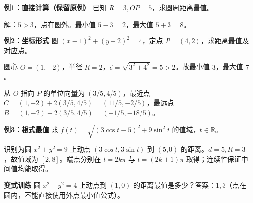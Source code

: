 \begin{examplebox}
\textbf{例1：直接计算（保留原例）}
已知 $R=3,OP=5$，求圆周距离最值。\begin{center}

\end{center}
解：$5>3$，点在圆外。最小值 $5-3=2$，最大值 $5+3=8$。

\textbf{例2：坐标形式} 圆 $(x-1)^2+(y+2)^2=4$，定点 $P=(4,2)$，求距离最值及对应点。

圆心 $O=(1,-2)$，半径 $R=2$，$d=\sqrt{3^2+4^2}=5>2$。故最小值 $3$，最大值 $7$。

从 $O$ 指向 $P$ 的单位向量为 $(3/5,4/5)$，最近点 $C=(1,-2)+2(3/5,4/5)=(11/5,-2/5)$，最远点 $B=(1,-2)-2(3/5,4/5)=(-1/5,-18/5)$。\begin{center}

\end{center}

\textbf{例3：根式最值} 求 $f(t)=\sqrt{(3\cos t-5)^2+9\sin^2t}$ 的值域，$t\in\mathbb R$。

识别为圆 $x^2+y^2=9$ 上动点 $(3\cos t,3\sin t)$ 到 $(5,0)$ 的距离。$d=5,R=3$，故值域为 $[2,8]$。端点分别在 $t=2k\pi$ 与 $t=(2k+1)\pi$ 取得；连续性保证中间值均能取得。\begin{center}

\end{center}

\textbf{变式训练} 圆 $x^2+y^2=4$ 上动点到 $(1,0)$ 的距离最值是多少？答案：$1,3$（点在圆内，不能直接使用外点最小值公式）。
\end{examplebox}
